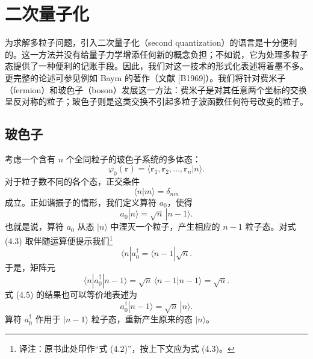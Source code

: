 \chapter{二次量子化}

为求解多粒子问题，引入二次量子化（second quantization）的语言是十分便利的。这一方法并没有给量子力学增添任何新的概念负担；不如说，它为处理多粒子态提供了一种便利的记账手段。因此，我们对这一技术的形式化表述将着墨不多。更完整的论述可参见例如 Baym 的著作（文献 [B1969]）。我们将针对费米子（fermion）和玻色子（boson）发展这一方法：费米子是对其任意两个坐标的交换呈反对称的粒子；玻色子则是这类交换不引起多粒子波函数任何符号改变的粒子。

\section{玻色子}

考虑一个含有 $n$ 个全同粒子的玻色子系统的多体态：
\begin{equation*}
\varphi_0(\mathbf{r})=\langle \mathbf{r}_1,\mathbf{r}_2,\ldots,\mathbf{r}_n|n\rangle.
\tag{4.1}
\end{equation*}
对于粒子数不同的各个态，正交条件
\begin{equation*}
\langle n|m\rangle=\delta_{nm}
\tag{4.2}
\end{equation*}
成立。正如谐振子的情形，我们定义算符 $a_0$，使得
\begin{equation*}
a_0|n\rangle=\sqrt{n}\,|n-1\rangle.
\tag{4.3}
\end{equation*}
也就是说，算符 $a_0$ 从态 $|n\rangle$ 中湮灭一个粒子，产生相应的 $n-1$ 粒子态。对式 (4.3) 取伴随运算便提示我们\footnote{译注：原书此处印作“式 (4.2)”，按上下文应为式 (4.3)。}
\begin{equation*}
\langle n|a_0^\dagger=\langle n-1|\sqrt{n}.
\tag{4.4}
\end{equation*}
于是，矩阵元
\begin{equation*}
\langle n|a_0^\dagger|n-1\rangle=\sqrt{n}\,\langle n-1|n-1\rangle=\sqrt{n}.
\tag{4.5}
\end{equation*}
式 (4.5) 的结果也可以等价地表述为
\begin{equation*}
a_0^\dagger|n-1\rangle=\sqrt{n}\,|n\rangle.
\tag{4.6}
\end{equation*}
算符 $a_0^\dagger$ 作用于 $|n-1\rangle$ 粒子态，重新产生原来的态 $|n\rangle$。

